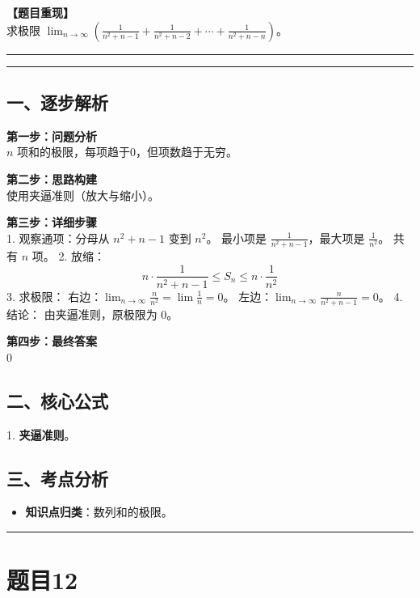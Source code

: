 \documentclass[12pt, a4paper]{ctexart}
\newcommand{\TopSeparator}{
    \par\noindent\rule{\textwidth}{1.5pt}\vspace{0.5em} %
}
\newcommand{\AnalysisSeparator}{
    \par\noindent\rule{\textwidth}{0.5pt}\vspace{0.2em}\hrule\vspace{0.5em} %
}
\newenvironment{RedAnalysis}{
    \par
    \color{red} %
}{
    \par
    \color{black} %
}
\begin{document}
\textbf{【题目重现】} \\
求极限 $ \lim_{n\to\infty}\left(\frac{1}{n^{2}+n-1}+\frac{1}{n^{2}+n-2}+\cdots+\frac{1}{n^{2}+n-n}\right) $。

\AnalysisSeparator

\begin{RedAnalysis}

\subsection*{一、逐步解析}

\textbf{第一步：问题分析} \\
$n$ 项和的极限，每项趋于0，但项数趋于无穷。

\textbf{第二步：思路构建} \\
使用夹逼准则（放大与缩小）。

\textbf{第三步：详细步骤} \\
1. 观察通项：分母从 $n^2+n-1$ 变到 $n^2$。
   最小项是 $\frac{1}{n^2+n-1}$，最大项是 $\frac{1}{n^2}$。
   共有 $n$ 项。
2. 放缩：
   \[ n \cdot \frac{1}{n^2+n-1} \le S_n \le n \cdot \frac{1}{n^2} \]
3. 求极限：
   右边：$\lim_{n\to\infty} \frac{n}{n^2} = \lim \frac{1}{n} = 0$。
   左边：$\lim_{n\to\infty} \frac{n}{n^2+n-1} = 0$。
4. 结论：
   由夹逼准则，原极限为 0。

\textbf{第四步：最终答案} \\
$0$

\subsection*{二、核心公式}
1. \textbf{夹逼准则}。

\subsection*{三、考点分析}
\begin{itemize}
    \item \textbf{知识点归类}：数列和的极限。
\end{itemize}

\end{RedAnalysis}

\vspace{2em}

\TopSeparator
\section*{题目12}
\end{document}
